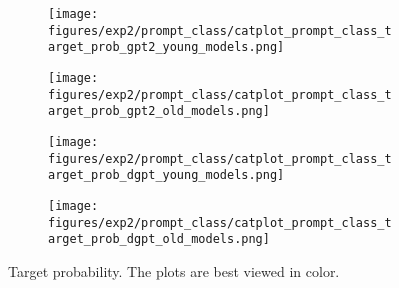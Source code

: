 \begin{figure}[H]
     \centering
     \begin{subfigure}[b]{0.48\textwidth}
        \centering
        \texttt{[image: figures/exp2/prompt\_class/catplot\_prompt\_class\_target\_prob\_gpt2\_young\_models.png]}
        \caption{}
        \label{subfig:catplot_prompt_class_target_prob_gpt2_young}
     \end{subfigure}
     \quad
     \begin{subfigure}[b]{0.48\textwidth}
        \centering
        \texttt{[image: figures/exp2/prompt\_class/catplot\_prompt\_class\_target\_prob\_gpt2\_old\_models.png]}
        \caption{}
        \label{subfig:catplot_prompt_class_target_prob_gpt2_old}
     \end{subfigure}
    \medskip
    \begin{subfigure}[b]{0.48\textwidth}
        \centering
        \texttt{[image: figures/exp2/prompt\_class/catplot\_prompt\_class\_target\_prob\_dgpt\_young\_models.png]}
        \caption{}
        \label{subfig:catplot_prompt_class_target_prob_dgpt_young}
     \end{subfigure}
    \quad
     \begin{subfigure}[b]{0.48\textwidth}
        \centering
        \texttt{[image: figures/exp2/prompt\_class/catplot\_prompt\_class\_target\_prob\_dgpt\_old\_models.png]}
        \caption{}
        \label{subfig:catplot_prompt_class_target_prob_dgpt_old}
     \end{subfigure}
    \caption{Target probability. The plots are best viewed in color. }
    \label{fig:catplot_prompt_class_target_prob}
\end{figure}

